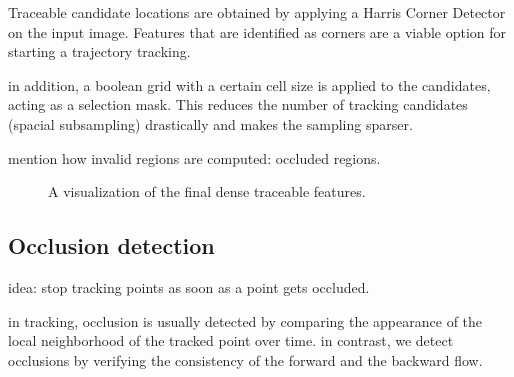 Traceable candidate locations are obtained by applying a Harris Corner Detector on the input image. 
Features that are identified as corners are a viable option for starting a trajectory tracking.

in addition, a boolean grid with a certain cell size is applied to the candidates, acting as a selection mask. This reduces the number of tracking candidates (spacial subsampling) drastically and makes the sampling sparser.


mention how invalid regions are computed: occluded regions.

\begin{figure}[H]
\begin{center}
\end{center}
\caption[Strict Dense Candidates]{A visualization of the final dense traceable features.}
\label{fig:tracable_candidates_strict}
\end{figure}







\subsection{Occlusion detection}
idea: stop tracking points as soon as a point gets occluded.

in tracking, occlusion is usually detected by comparing the appearance of the local neighborhood of the tracked point over time. in contrast, we detect occlusions by verifying the consistency of the forward and the backward flow.


